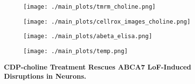 \begin{figure}[H]
\begin{subfigure}[t]{.37\textwidth}
        \texttt{[image: ./main\_plots/tmrm\_choline.png]}        
    \end{subfigure}  
    \begin{subfigure}[t]{.37\textwidth}
        \caption{}
        \texttt{[image: ./main\_plots/cellrox\_images\_choline.png]}        
    \end{subfigure}
    \begin{subfigure}[t]{.4\textwidth}
        \caption{}
        \texttt{[image: ./main\_plots/abeta\_elisa.png]}        
    \end{subfigure}  
    \begin{subfigure}[t]{.15\textwidth}
        \caption{}
        \texttt{[image: ./main\_plots/temp.png]}        
    \end{subfigure}  
    \caption{
        \textbf{CDP-choline Treatment Rescues ABCA7 LoF-Induced Disruptions in Neurons.}\\
    }
    \label{fig:main_choline}
\end{figure}
